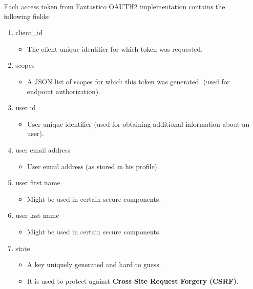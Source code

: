\documentclass[letterpaper,10pt,english]{sphinxmanual}
\begin{document}
Each access token from Fantastico OAUTH2 implementation contains the following fields:
\begin{enumerate}
\item {} 
client\_id
\begin{itemize}
\item {} 
The client unique identifier for which token was requested.

\end{itemize}

\item {} 
scopes
\begin{itemize}
\item {} 
A JSON list of scopes for which this token was generated. (used for endpoint authorization).

\end{itemize}

\item {} 
user id
\begin{itemize}
\item {} 
User unique identifier (used for obtaining additional information about an user).

\end{itemize}

\item {} 
user email address
\begin{itemize}
\item {} 
User email address (as stored in his profile).

\end{itemize}

\item {} 
user first name
\begin{itemize}
\item {} 
Might be used in certain secure components.

\end{itemize}

\item {} 
user last name
\begin{itemize}
\item {} 
Might be used in certain secure components.

\end{itemize}

\item {} 
state
\begin{itemize}
\item {} 
A key uniquely generated and hard to guess.

\item {} 
It is used to protect against \textbf{Cross Site Request Forgery (CSRF)}.


\end{itemize}
\end{enumerate}
\end{document}
